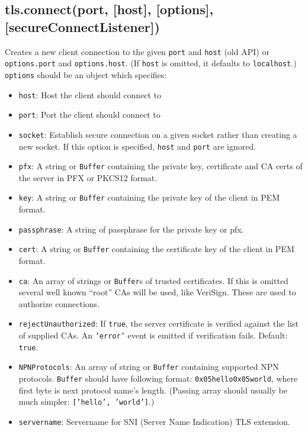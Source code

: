 \subsection{tls.connect(port, {[}host{]}, {[}options{]},
{[}secureConnectListener{]})}

Creates a new client connection to the given \texttt{port} and
\texttt{host} (old API) or \texttt{options.port} and
\texttt{options.host}. (If \texttt{host} is omitted, it defaults to
\texttt{localhost}.) \texttt{options} should be an object which
specifies:

\begin{itemize}
\item
  \texttt{host}: Host the client should connect to
\item
  \texttt{port}: Port the client should connect to
\item
  \texttt{socket}: Establish secure connection on a given socket rather
  than creating a new socket. If this option is specified, \texttt{host}
  and \texttt{port} are ignored.
\item
  \texttt{pfx}: A string or \texttt{Buffer} containing the private key,
  certificate and CA certs of the server in PFX or PKCS12 format.
\item
  \texttt{key}: A string or \texttt{Buffer} containing the private key
  of the client in PEM format.
\item
  \texttt{passphrase}: A string of passphrase for the private key or
  pfx.
\item
  \texttt{cert}: A string or \texttt{Buffer} containing the certificate
  key of the client in PEM format.
\item
  \texttt{ca}: An array of strings or \texttt{Buffer}s of trusted
  certificates. If this is omitted several well known ``root'' CAs will
  be used, like VeriSign. These are used to authorize connections.
\item
  \texttt{rejectUnauthorized}: If \texttt{true}, the server certificate
  is verified against the list of supplied CAs. An \texttt{'error'}
  event is emitted if verification fails. Default: \texttt{true}.
\item
  \texttt{NPNProtocols}: An array of string or \texttt{Buffer}
  containing supported NPN protocols. \texttt{Buffer} should have
  following format: \texttt{0x05hello0x05world}, where first byte is
  next protocol name's length. (Passing array should usually be much
  simpler: \texttt{{[}'hello', 'world'{]}}.)
\item
  \texttt{servername}: Servername for SNI (Server Name Indication) TLS
  extension.
\end{itemize}

